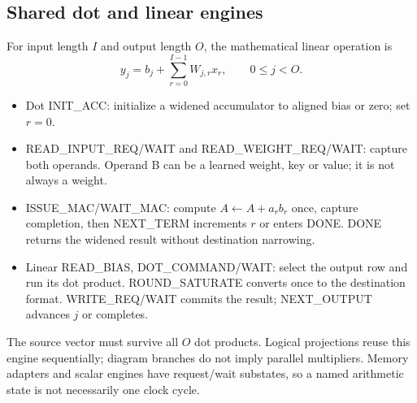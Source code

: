 \subsection{Shared dot and linear engines}
For input length $I$ and output length $O$, the mathematical linear operation is
\[
y_j=b_j+\sum_{r=0}^{I-1}W_{j,r}x_r,\qquad 0\leq j<O.
\]
\begin{itemize}
\item Dot INIT\_ACC: initialize a widened accumulator to aligned bias or zero; set $r=0$.
\item READ\_INPUT\_REQ/WAIT and READ\_WEIGHT\_REQ/WAIT: capture both operands. Operand B can be a learned weight, key or value; it is not always a weight.
\item ISSUE\_MAC/WAIT\_MAC: compute $A\leftarrow A+a_rb_r$ once, capture completion, then NEXT\_TERM increments $r$ or enters DONE. DONE returns the widened result without destination narrowing.
\item Linear READ\_BIAS, DOT\_COMMAND/WAIT: select the output row and run its dot product. ROUND\_SATURATE converts once to the destination format. WRITE\_REQ/WAIT commits the result; NEXT\_OUTPUT advances $j$ or completes.
\end{itemize}
The source vector must survive all $O$ dot products. Logical projections reuse this engine sequentially; diagram branches do not imply parallel multipliers. Memory adapters and scalar engines have request/wait substates, so a named arithmetic state is not necessarily one clock cycle.


